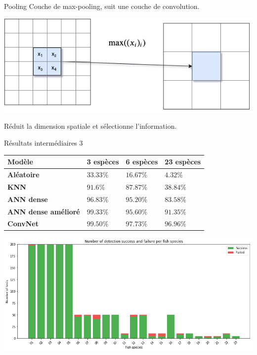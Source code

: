 \documentclass[10pt,xcolor={x11names}]{beamer}
\begin{document}
\begin{frame}{Pooling}
	Couche de max-pooling, suit une couche de convolution.
	\begin{center}
		\includegraphics[width=\textwidth]{maxpool.png}
	\end{center}
	Réduit la dimension spatiale et sélectionne l'information.
\end{frame}



\begin{frame}{Résultats intermédiaires 3}
	\begin{tabular}{ |m{10em}|m{5.5em}|m{5.5em}|m{5.5em}| }
		\hline
		Modèle & \textbf{3 espèces} & \textbf{6 espèces} &  \textbf{23 espèces} \\
		\hline
		\textbf{Aléatoire} & $33.33\%$ & $16.67\%$ & $4.32\%$ \\
		\textbf{KNN} & $91.6\%$ & $87.87\%$ & $38.84\%$ \\
		\textbf{ANN dense} & $96.83\%$ & $95.20\%$ & $83.58\%$ \\
		\textbf{ANN dense amélioré} & $99.33\%$ & $95.60\%$ & $91.35\%$ \\
		\textbf{ConvNet} & $99.50\%$ & $97.73\%$ & $96.96\%$ \\
		\hline
	\end{tabular}
	\begin{center}
		\includegraphics[width=\linewidth]{conv2_results.png}
	\end{center}
	
\end{frame}
\end{document}
